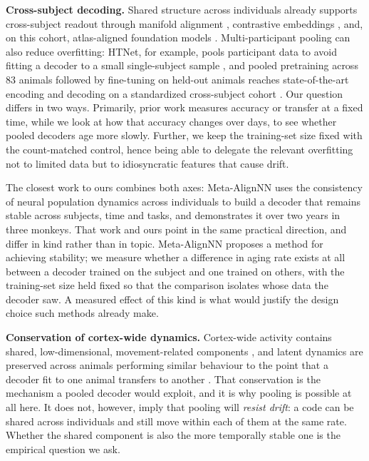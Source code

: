 \documentclass[mlmain,onecolumn]{jmlr}
\begin{document}
\textbf{Cross-subject decoding.} Shared structure across individuals already supports cross-subject
readout through manifold alignment \citep{melbaum2022}, contrastive embeddings \citep{schneider2023},
and, on this cohort, atlas-aligned foundation models \citep{wicat2026}. Multi-participant pooling can
also reduce overfitting: HTNet, for example, pools participant data to avoid fitting a decoder to a
small single-subject sample \citep{peterson2021}, and pooled pretraining across 83 animals followed
by fine-tuning on held-out animals reaches state-of-the-art encoding and decoding on a standardized
cross-subject cohort \citep{neds2025}. Our question differs in two ways. Primarily, prior work
measures accuracy or transfer at a fixed time, while we look at how that accuracy changes over days,
to see whether pooled decoders age more slowly. Further, we keep the training-set size fixed with the
count-matched control, hence being able to delegate the relevant overfitting not to limited data but
to idiosyncratic features that cause drift.

The closest work to ours combines both axes: Meta-AlignNN \citep{metaalign2025} uses the consistency
of neural population dynamics across individuals to build a decoder that remains stable across
subjects, time and tasks, and demonstrates it over two years in three monkeys. That work and ours
point in the same practical direction, and differ in kind rather than in topic. Meta-AlignNN proposes
a method for achieving stability; we measure whether a difference in aging rate exists at all between
a decoder trained on the subject and one trained on others, with the training-set size held fixed so
that the comparison isolates whose data the decoder saw. A measured effect of this kind is what would
justify the design choice such methods already make.

\textbf{Conservation of cortex-wide dynamics.} Cortex-wide activity contains shared,
low-dimensional, movement-related components \citep{musall2019,macdowell2020,macdowell2024}, and
latent dynamics are preserved across animals performing similar behaviour to the point that a decoder
fit to one animal transfers to another \citep{safaie2023}. That conservation is the mechanism a
pooled decoder would exploit, and it is why pooling is possible at all here. It does not, however,
imply that pooling will \emph{resist drift}: a code can be shared across individuals and still move
within each of them at the same rate. Whether the shared component is also the more temporally stable
one is the empirical question we ask.
\end{document}
